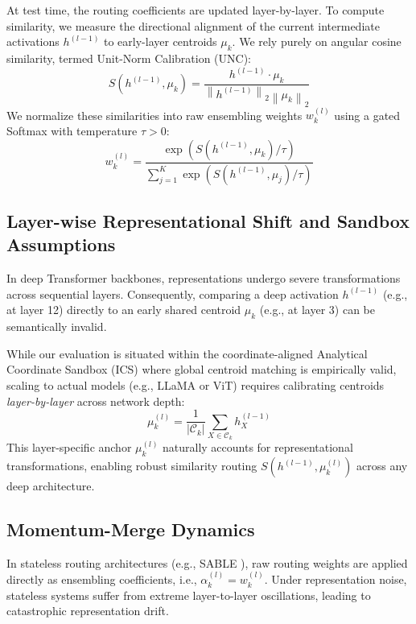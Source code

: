 At test time, the routing coefficients are updated layer-by-layer. To compute similarity, we measure the directional alignment of the current intermediate activations $h^{(l-1)}$ to early-layer centroids $\mu_k$. We rely purely on angular cosine similarity, termed Unit-Norm Calibration (UNC):
\begin{equation}
    S\left(h^{(l-1)}, \mu_k\right) = \frac{h^{(l-1)} \cdot \mu_k}{\left\|h^{(l-1)}\right\|_2 \left\|\mu_k\right\|_2}
    \label{eq:cosine_similarity}
\end{equation}
We normalize these similarities into raw ensembling weights $w_k^{(l)}$ using a gated Softmax with temperature $\tau > 0$:
\begin{equation}
    w_k^{(l)} = \frac{\exp\left(S\left(h^{(l-1)}, \mu_k\right) / \tau\right)}{\sum_{j=1}^K \exp\left(S\left(h^{(l-1)}, \mu_j\right) / \tau\right)}
    \label{eq:softmax_routing}
\end{equation}

\subsection{Layer-wise Representational Shift and Sandbox Assumptions}
In deep Transformer backbones, representations undergo severe transformations across sequential layers. Consequently, comparing a deep activation $h^{(l-1)}$ (e.g., at layer 12) directly to an early shared centroid $\mu_k$ (e.g., at layer 3) can be semantically invalid. 

While our evaluation is situated within the coordinate-aligned Analytical Coordinate Sandbox (ICS) \cite{chemmerge} where global centroid matching is empirically valid, scaling to actual models (e.g., LLaMA or ViT) requires calibrating centroids \emph{layer-by-layer} across network depth:
\begin{equation}
    \mu_k^{(l)} = \frac{1}{|\mathcal{C}_k|} \sum_{X \in \mathcal{C}_k} h_{X}^{(l-1)}
    \label{eq:layerwise_centroids}
\end{equation}
This layer-specific anchor $\mu_k^{(l)}$ naturally accounts for representational transformations, enabling robust similarity routing $S\left(h^{(l-1)}, \mu_k^{(l)}\right)$ across any deep architecture.

\subsection{Momentum-Merge Dynamics}
In stateless routing architectures (e.g., SABLE \cite{sable}), raw routing weights are applied directly as ensembling coefficients, i.e., $\alpha_k^{(l)} = w_k^{(l)}$. Under representation noise, stateless systems suffer from extreme layer-to-layer oscillations, leading to catastrophic representation drift. 

